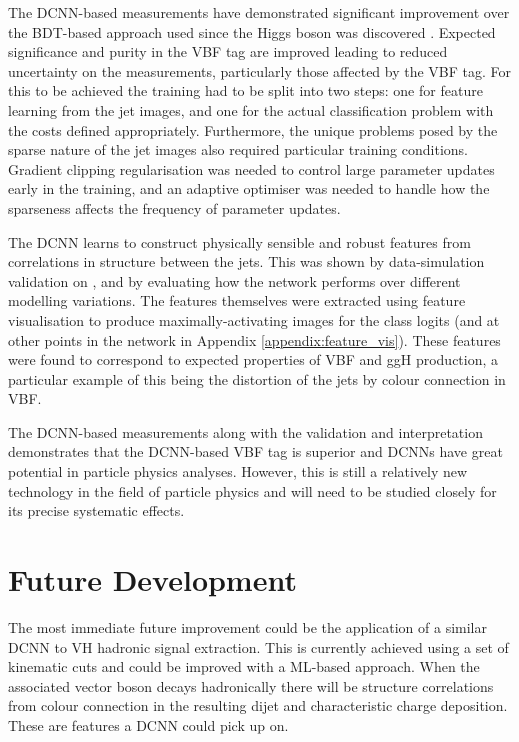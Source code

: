 The DCNN-based measurements have demonstrated significant improvement over the BDT-based approach \cite{HIG-16-040} used since the Higgs boson was discovered \cite{CMS_Higgs_disc}.
Expected significance and purity in the VBF tag are improved leading to reduced uncertainty on the measurements, particularly those affected by the VBF tag. 
For this to be achieved the training had to be split into two steps: one for feature learning from the jet images, and one for the actual classification problem with the costs defined appropriately.
Furthermore, the unique problems posed by the sparse nature of the jet images also required particular training conditions. 
Gradient clipping regularisation was needed to control large parameter updates early in the training, and an adaptive optimiser was needed to handle how the sparseness affects the frequency of parameter updates.

The DCNN learns to construct physically sensible and robust features from correlations in structure between the jets.
This was shown by data-simulation validation on \Zee, and by evaluating how the network performs over different modelling variations. 
The features themselves were extracted using feature visualisation to produce maximally-activating images for the class logits (and at other points in the network in Appendix \ref{appendix:feature_vis}). 
These features were found to correspond to expected properties of VBF and ggH production, a particular example of this being the distortion of the jets by colour connection in VBF.

The DCNN-based measurements along with the validation and interpretation demonstrates that the DCNN-based VBF tag is superior and DCNNs have great potential in particle physics analyses.
However, this is still a relatively new technology in the field of particle physics and will need to be studied closely for its precise systematic effects.




\section{Future Development}
The most immediate future improvement could be the application of a similar DCNN to VH hadronic signal extraction.
This is currently achieved using a set of kinematic cuts and could be improved with a ML-based approach.
When the associated vector boson decays hadronically there will be structure correlations from colour connection in the resulting dijet and characteristic charge deposition.
These are features a DCNN could pick up on.

